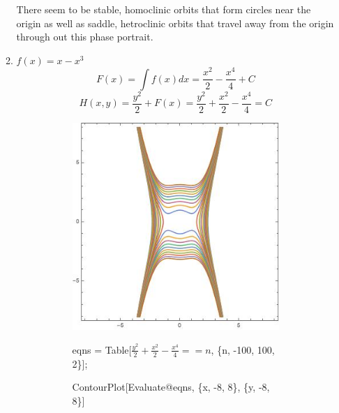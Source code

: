 \documentclass[12pt,letterpaper,reqno]{amsart}
\begin{document}
\begin{enumerate}
\begin{flushleft}
\begin{enumerate}
    \begin{flushleft}
    There seem to be stable, homoclinic orbits that form circles near the origin as well as saddle, hetroclinic orbits that travel away from the origin through out this phase portrait.
    \end{flushleft}
    
    \newpage
    \item
    \begin{flushleft}
    $f(x) = x - x^3$
    \newline
    $$F(x) = \int f(x)dx = \frac{x^2}{2} - \frac{x^4}{4} + C$$
    $$H(x,y) = \frac{y^2}{2} + F(x) = \frac{y^2}{2} + \frac{x^2}{2} - \frac{x^4}{4} = C$$
    
    \end{flushleft}
    
    \begin{figure}[h]
    \centering
    \begin{subfigure}{.5\textwidth}
      \centering
      \includegraphics[width=.8\linewidth]{./ContourPlotB.jpeg}
      \caption*{eqns = Table[$\frac{y^2}{2} + \frac{x^2}{2} - \frac{x^4}{4} == n$, \{n, -100, 100, 2\}];}
      \caption*{ContourPlot[Evaluate@eqns, \{x, -8, 8\}, \{y, -8, 8\}]}
    \end{subfigure}%
    \begin{subfigure}{.5\textwidth}
      \centering

\end{subfigure}
\end{figure}
\end{enumerate}
\end{flushleft}
\end{enumerate}
\end{document}
